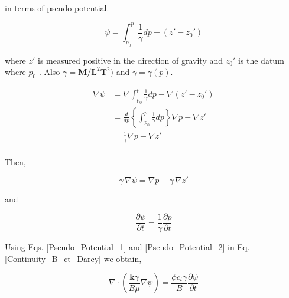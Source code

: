 \documentclass{llncs}
\numberwithin{equation}{section}
\numberwithin{figure}{section}
\numberwithin{table}{section}
\begin{document}
     in terms of pseudo potential.

    \begin{equation}
        \psi =\int_{{{p}_{0}}}^{p}{\frac{1}{\gamma }dp}-\left( z'-{{z}_{0}}' \right)
    \label{Pseudo_Potential}
    \end{equation}  

    where $z'$ is measured positive in the direction of gravity and ${{z}_{0}}'$ is the datum where ${{p}_{0}}$ . Also $\gamma=\mathbf{M}/\mathbf{L}^{2}\mathbf{T}^{2})$ and $\gamma=\gamma(p)$.
    
    \begin{equation*}
        \begin{split}
             \nabla \psi & =\nabla \int_{{{p}_{0}}}^{p}{\frac{1}{\gamma }dp}-\nabla \left( z'-{{z}_{0}}' \right) \\
            & =\frac{d}{dp}\left\{ \int_{{{p}_{0}}}^{p}{\frac{1}{\gamma }dp} \right\}\nabla p-\nabla z' \\
            & =\frac{1}{\gamma }\nabla p-\nabla z' \\
        \end{split}
    \end{equation*}  

    Then,
    
    \begin{equation}
        \gamma \,\nabla \psi =\nabla p-\gamma \,\nabla z'
    \label{Pseudo_Potential_1}
    \end{equation}  

    and

    \begin{equation}
        \frac{\partial \psi }{\partial t}=\frac{1}{\gamma }\frac{\partial p}{\partial t}
    \label{Pseudo_Potential_2}
    \end{equation}      
    
    Using Eqs. \ref{Pseudo_Potential_1} and \ref{Pseudo_Potential_2} in Eq. \ref{Continuity_B_ct_Darcy} we obtain,
    
    \begin{equation}
        \nabla \cdot \left( \frac{\mathbf{k}\gamma }{B\mu }\nabla \psi  \right)=\frac{\phi {{c}_{t}}\gamma }{B}\frac{\partial \psi }{\partial t}
    \label{Pseudo_Potential_Final}
    \end{equation}     
    
\end{document}
